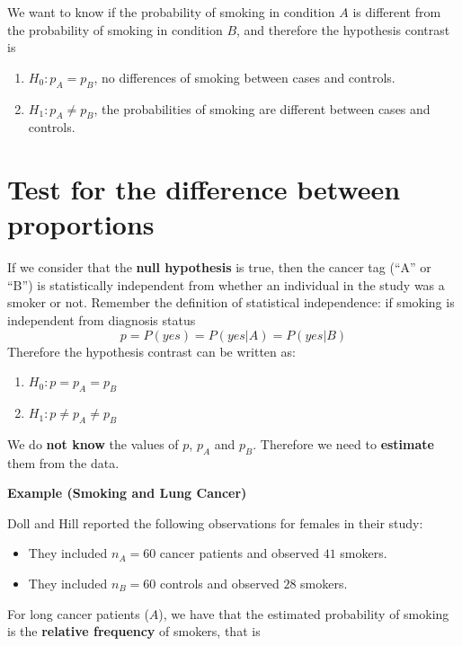 \documentclass[
]{book}
\providecommand{\tightlist}{%
  \setlength{\itemsep}{0pt}\setlength{\parskip}{0pt}}
\begin{document}
We want to know if the probability of smoking in condition \(A\) is different from the probability of smoking in condition \(B\), and therefore the hypothesis contrast is

\begin{enumerate}
\def\labelenumi{\alph{enumi}.}
\tightlist
\item
  \(H_0: p_A=p_B\), no differences of smoking between cases and controls.
\item
  \(H_1: p_A\neq p_B\), the probabilities of smoking are different between cases and controls.
\end{enumerate}

\hypertarget{test-for-the-difference-between-proportions}{%
\section{Test for the difference between proportions}\label{test-for-the-difference-between-proportions}}

If we consider that the \textbf{null hypothesis} is true, then the cancer tag (``A'' or ``B'') is statistically independent from whether an individual in the study was a smoker or not. Remember the definition of statistical independence: if smoking is independent from diagnosis status
\[p=P(yes)=P(yes|A)=P(yes|B)\]
Therefore the hypothesis contrast can be written as:

\begin{enumerate}
\def\labelenumi{\alph{enumi}.}
\tightlist
\item
  \(H_0: p=p_A=p_B\)
\item
  \(H_1: p\neq p_A \neq p_B\)
\end{enumerate}

We do \textbf{not know} the values of \(p\), \(p_A\) and \(p_B\). Therefore we need to \textbf{estimate} them from the data.

\textbf{Example (Smoking and Lung Cancer)}

Doll and Hill reported the following observations for females in their study:

\begin{itemize}
\item
  They included \(n_A=60\) cancer patients and observed \(41\) smokers.
\item
  They included \(n_B=60\) controls and observed \(28\) smokers.
\end{itemize}

For long cancer patients (\(A\)), we have that the estimated probability of smoking is the \textbf{relative frequency} of smokers, that is
\end{document}
